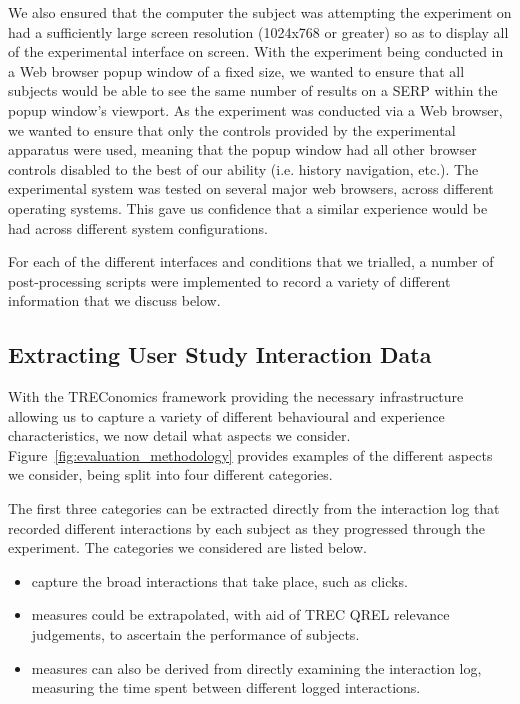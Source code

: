 We also ensured that the computer the subject was attempting the experiment on had a sufficiently large screen resolution (1024x768 or greater) so as to display all of the experimental interface on screen. With the experiment being conducted in a Web browser popup window of a fixed size, we wanted to ensure that all subjects would be able to see the same number of results on a SERP within the popup window's viewport. As the experiment was conducted via a Web browser, we wanted to ensure that only the controls provided by the experimental apparatus were used, meaning that the popup window had all other browser controls disabled to the best of our ability (i.e. history navigation, etc.). The experimental system was tested on several major web browsers, across different operating systems. This gave us confidence that a similar experience would be had across different system configurations.

For each of the different interfaces and conditions that we trialled, a number of post-processing scripts were implemented to record a variety of different information that we discuss below.


\subsection{Extracting User Study Interaction Data}\label{sec:csm:methodology:extracting}
With the TREConomics framework providing the necessary infrastructure allowing us to capture a variety of different behavioural and experience characteristics, we now detail what aspects we consider. Figure~\ref{fig:evaluation_methodology} provides examples of the different aspects we consider, being split into four different categories.

The first three categories can be extracted directly from the interaction log that recorded different interactions by each subject as they progressed through the experiment. The categories we considered are listed below.

\begin{itemize}
    
    \item[]{ capture the broad interactions that take place, such as clicks.}
    \item[]{ measures could be extrapolated, with aid of TREC QREL relevance judgements, to ascertain the performance of subjects.}
    \item[]{ measures can also be derived from directly examining the interaction log, measuring the time spent between different logged interactions.}
    
\end{itemize}

